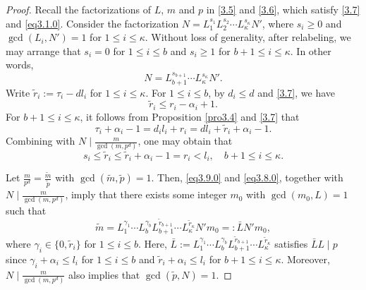 \documentclass[11pt]{article}
\numberwithin{equation}{section}
\begin{document}
\begin{proof}
Recall the factorizations of $L$, $m$ and $p$ in \eqref{3.5} and \eqref{3.6},  which satisfy  \eqref{3.7} and \eqref{eq3.1.0}. 
Consider the factorization $N = L_{1}^{s_{1}}L_{2}^{s_{2}}\cdots L_{\kappa}^{s_{\kappa}}N'$, where $s_i\geq 0$ and $\gcd(L_i, N')=1$ for $1\leq i\leq \kappa$. Without loss of generality, after relabeling, we may arrange that $s_i = 0$ for $1 \leq i \leq b$ and $s_i \geq 1$ for $b+1 \leq i \leq \kappa$. In other words,
\begin{equation}\label{3.12}
N= L_{b+1}^{s_{b+1}}\cdots L_{\kappa}^{s_{\kappa}}N'.
\end{equation}
Write $\tilde{r}_i:=\tau_i-dl_i$ for $1\leq i\leq \kappa$. For $1\leq i\leq b$, by $d_i\leq d$ and \eqref{3.7}, we have
	\begin{equation}\label{eq3.9.0}
		\tilde{r}_i\leq r_i-\alpha_i+1.
	\end{equation}
For $b+1\leq i\leq\kappa$, it follows from  Proposition \ref{pro3.4} and \eqref{3.7} that
	$$ \tau_i+\alpha_i-1=d_il_i+r_i=dl_i+\tilde{r}_i+\alpha_i-1.
	$$
	Combining with $N\mid\frac{m}{\gcd(m,p^d)}$, one may obtain that
	\begin{equation}\label{eq3.8.0}
		s_i\leq \tilde{r}_i\leq \tilde{r}_i+\alpha_i-1= r_i<l_i, \quad b+1\leq i\leq \kappa.
	\end{equation}

Let $\frac{m}{p^d}=\frac{\tilde{m}}{\tilde{p}}$ with $\gcd(\tilde{m}, \tilde{p})=1$. Then, \eqref{eq3.9.0} and \eqref{eq3.8.0}, together with $N\mid\frac{m}{\gcd(m,p^d)}$, imply that there exists some integer $m_0$ with $\gcd(m_0,L)=1$ such that
$$\tilde{m}=L_1^{\gamma_1}\cdots L_b^{\gamma_b}  L_{b+1}^{\tilde{r}_{b+1}}\cdots L_{\kappa}^{\tilde{r}_\kappa}N'm_0=:\bar{L}N'm_0,$$
where $\gamma_i\in\{0,\tilde{r}_i\}$ for $1\leq i\leq b$. Here,
	$\bar{L}:=L_1^{\gamma_1}\cdots L_b^{\gamma_b} L_{b+1}^{\tilde{r}_{b+1}}\cdots L_{\kappa}^{\tilde{r}_\kappa}$
	satisfies $\bar{L}L\mid p$ since $\gamma_i+\alpha_i\leq l_i$ for $1\leq i\leq b$ and $\tilde{r}_{i}+\alpha_i\leq l_i$ for $b+1\leq i\leq \kappa$. Moreover, $N\mid\frac{m}{\gcd(m,p^d)}$ also implies that $\gcd(\tilde{p},N)=1$.

	




\end{proof}
\end{document}
